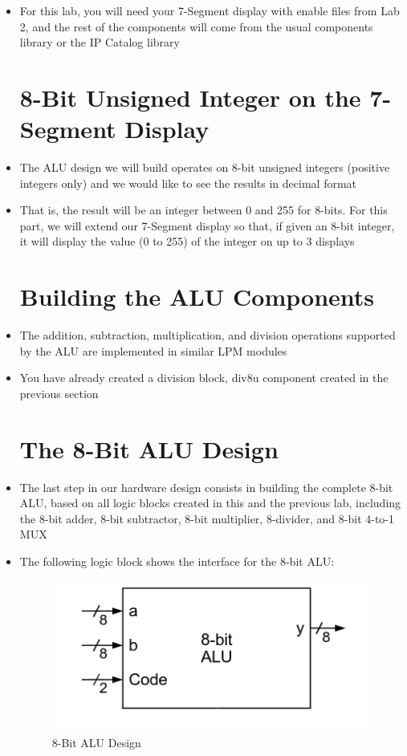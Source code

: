 \begin{itemize}
  \item For this lab, you will need your 7-Segment display with enable files from Lab 2, and the rest of the components will come from the usual components library or the IP Catalog library

    \section{8-Bit Unsigned Integer on the 7-Segment Display}

  \item The ALU design we will build operates on 8-bit unsigned integers (positive integers only) and we would like to see the results in decimal format

  \item That is, the result will be an integer between 0 and 255 for 8-bits. For this part, we will extend our 7-Segment display so that, if given an 8-bit integer, it will display the value (0 to 255) of the integer on up to 3 displays

    \section{Building the ALU Components}

  \item The addition, subtraction, multiplication, and division operations supported by the ALU are implemented in similar LPM modules

  \item You have already created a division block, div8u component created in the previous section

    \section{The 8-Bit ALU Design}

  \item The last step in our hardware design consists in building the complete 8-bit ALU, based on all logic blocks created in this and the previous lab, including the 8-bit adder, 8-bit subtractor, 8-bit multiplier, 8-divider, and 8-bit 4-to-1 MUX

  \item The following logic block shows the interface for the 8-bit ALU:

    \begin{figure}[h!]
      \centering
      \includegraphics[width=.65\textwidth]{Figures/8BALU.png}
      \caption{8-Bit ALU Design}
      \label{fig:2}
    \end{figure}


\end{itemize}
